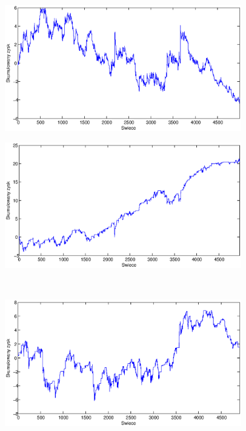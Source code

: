 \begin{figure}[h]
\centering
\begin{minipage}{.49\linewidth}
\centering
\includegraphics[width=0.92\textwidth]{images/S1a_eurjpy.eps}
\label{jedno}
\end{minipage}
\begin{minipage}{.49\linewidth}
\centering
\includegraphics[width=0.92\textwidth]{images/S1b_eurjpy.eps}
\label{dwu}
\end{minipage}
\\
\begin{minipage}{.49\linewidth}
\centering
\includegraphics[width=0.92\textwidth]{images/S1c_eurjpy.eps}

\end{minipage}
\end{figure}
